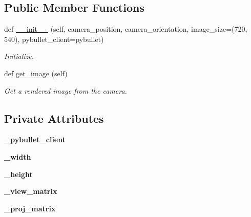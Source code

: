 \subsection*{Public Member Functions}
\begin{DoxyCompactItemize}
\item 
def \hyperlink{classtrifinger__simulation_1_1camera_1_1Camera_a127b955afd7508c05984516b528be056}{\+\_\+\+\_\+init\+\_\+\+\_\+} (self, camera\+\_\+position, camera\+\_\+orientation, image\+\_\+size=(720, 540), pybullet\+\_\+client=pybullet)
\begin{DoxyCompactList}\small\item\em Initialize. \end{DoxyCompactList}\item 
def \hyperlink{classtrifinger__simulation_1_1camera_1_1Camera_a6055089009e1f63df5ced179e5c56254}{get\+\_\+image} (self)
\begin{DoxyCompactList}\small\item\em Get a rendered image from the camera. \end{DoxyCompactList}\end{DoxyCompactItemize}
\subsection*{Private Attributes}
\begin{DoxyCompactItemize}
\item 
\mbox{\label{classtrifinger__simulation_1_1camera_1_1Camera_aa5bdad783d26e773b59eb422fb8ea43b}} 
{\bfseries \+\_\+pybullet\+\_\+client}
\item 
\mbox{\label{classtrifinger__simulation_1_1camera_1_1Camera_ae6b19b98794b9a6cbe0e7ee3d8e17281}} 
{\bfseries \+\_\+width}
\item 
\mbox{\label{classtrifinger__simulation_1_1camera_1_1Camera_abb68a4b72e3d49c124c90e0001735224}} 
{\bfseries \+\_\+height}
\item 
\mbox{\label{classtrifinger__simulation_1_1camera_1_1Camera_aafd383344a242bae5b6305ab33bc64ae}} 
{\bfseries \+\_\+view\+\_\+matrix}
\item 
\mbox{\label{classtrifinger__simulation_1_1camera_1_1Camera_a5717913c70a7349ac81d2717325e0fbb}} 
{\bfseries \+\_\+proj\+\_\+matrix}
\end{DoxyCompactItemize}


